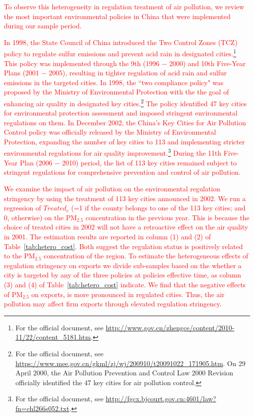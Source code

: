 \documentclass[12pt]{article}
\begin{document}
\textcolor{red}{To observe this heterogeneity in regulation treatment of air pollution, we review the most important environmental policies in China that were implemented during our sample period.} 

\textcolor{red}{In 1998, the State Council of China introduced the Two Control Zones (TCZ) policy to regulate sulfur emissions and prevent acid rain in designated cities.\footnote{For the official document, see \url{http://www.gov.cn/zhengce/content/2010-11/22/content_5181.htm}.} This policy was implemented through the 9th (1996 $-$ 2000) and 10th Five-Year Plans (2001 $-$ 2005), resulting in tighter regulation of acid rain and sulfur emissions in the targeted cities. In 1998, the ``two compliance policy" was proposed by the Ministry of Environmental Protection with the the goal of  enhancing air quality in designated key cities.\footnote{For the official document, see \url{https://www.mee.gov.cn/gkml/zj/wj/200910/t20091022_171905.htm}. On 29 April 2000, the Air Pollution Prevention and Control Law 2000 Revision officially identified the 47 key cities for air pollution control. } The policy identified 47 key cities for environmental protection assessment and imposed stringent environmental regulations on them. In December 2002, the China’s Key Cities for Air Pollution Control policy was officially released by the Ministry of Environmental Protection, expanding the number of key cities to 113 and implementing stricter environmental regulations for air quality improvement.\footnote{For the official document, see \url{http://fgcx.bjcourt.gov.cn:4601/law?fn=chl266s052.txt}.} During the 11th Five-Year Plan (2006 $-$ 2010) period, the list of 113 key cities remained subject to stringent regulations for comprehensive prevention and control of air pollution.}

\textcolor{red}{We examine the impact of air pollution on the environmental regulation stringency by using the treatment of 113 key cities announced in 2002. We run a regression of $Treated_{c}$ (=1 if the county belongs to one of the 113 key cities; and 0, otherwise) on the $\mathrm{PM_{2.5}}$ concentration in the previous year. This is because the choice of treated cities in 2002 will not have a retroactive effect on the air quality in 2001. The estimation results are reported in column (1) and (2) of Table~\ref{tab:hetero_cost}. Both suggest the regulation
status is positively related to the $\mathrm{PM_{2.5}}$ concentration of the region. To estimate the heterogeneous effects of regulation stringency on exports we divide sub-samples based on the whether a city is targeted by any of the three policies at policies effective time, as column (3) and (4) of Table~\ref{tab:hetero_cost} indicate. We find that
the negative effects of $\mathrm{PM_{2.5}}$ on exports, is more pronounced
in regulated cities. Thus, the air pollution may affect firm exports through
elevated regulation stringency.}
\end{document}

